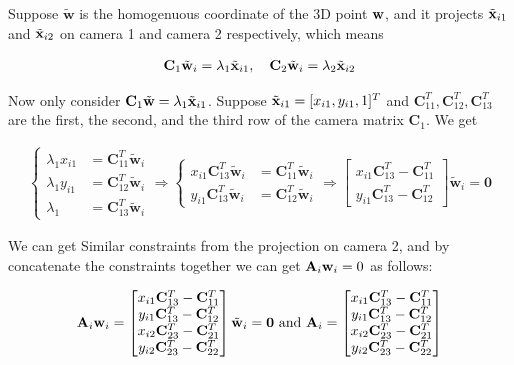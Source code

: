 \documentclass[11pt]{article}
\begin{document}
\newcommand {\camera} {\mathbf{C}}
\newcommand {\homow} {\tilde{\mathbf{w}}}
\newcommand {\ct} {\camera^T}
\newcommand {\bA} {\mathbf{A}}

Suppose $\homow$ is the homogenuous coordinate of the 3D point $\mathbf{w}$, and it projects $\tilde{\mathbf{x}}_{i1}$ and $\tilde{\mathbf{x}}_{i2}$ on camera 1 and camera 2 respectively, which means

\begin{align}
    \camera_1 \homow_i = \lambda_1\homox_{i1}, \quad \camera_2 \homow_i = \lambda_2\homox_{i2}
\end{align}

Now only consider $\camera_1 \homow = \lambda_1\homox_{i1}$. Suppose $\tilde{\mathbf{x}}_{i1} = [x_{i1}, y_{i1}, 1]^T$ and $\ct_{11}, \ct_{12}, \ct_{13}$ are the first, the second, and the third row of the camera matrix $\camera_1$. We get

\begin{align}
    \begin{cases}
        \lambda_1 x_{i1} &= \ct_{11} \homow_i \\
        \lambda_1 y_{i1} &= \ct_{12} \homow_i \\
        \lambda_1 &= \ct_{13} \homow_i
    \end{cases}
    \Rightarrow
    \begin{cases}
        x_{i1} \ct_{13} \homow_i &= \ct_{11} \homow_i \\
        y_{i1} \ct_{13} \homow_i &= \ct_{12} \homow_i
    \end{cases}
    \Rightarrow
    \begin{bmatrix}
        x_{i1} \ct_{13} - \ct_{11}\\
        y_{i1} \ct_{13} - \ct_{12}
    \end{bmatrix}
    \homow_i = \mathbf{0}
\end{align}

We can get Similar constraints from the projection on camera 2, and by concatenate the constraints together we can get $\bA_i\bw_i=0$ as follows:

\begin{align}
    \bA_i\bw_i =
    \begin{bmatrix}
        x_{i1} \ct_{13} - \ct_{11}\\
        y_{i1} \ct_{13} - \ct_{12}\\
        x_{i2} \ct_{23} - \ct_{21}\\
        y_{i2} \ct_{23} - \ct_{22}
    \end{bmatrix}
    \homow_i = \mathbf{0}
    \textrm{ and }
    \bA_i =
    \begin{bmatrix}
        x_{i1} \ct_{13} - \ct_{11}\\
        y_{i1} \ct_{13} - \ct_{12}\\
        x_{i2} \ct_{23} - \ct_{21}\\
        y_{i2} \ct_{23} - \ct_{22}
    \end{bmatrix}
\end{align}
\end{document}
